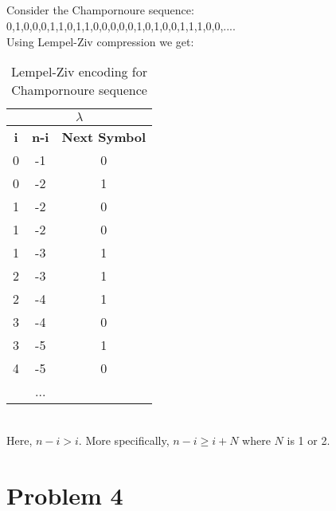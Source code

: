 \documentclass[paper=a4, fontsize=11pt]{scrartcl} %
\numberwithin{equation}{section} %
\numberwithin{figure}{section} %
\numberwithin{table}{section} %
\begin{document}
\subsection{}
Consider the Champornoure sequence:\\ 0,1,0,0,0,1,1,0,1,1,0,0,0,0,0,1,0,1,0,0,1,1,1,0,0,....\\
Using Lempel-Ziv compression we get: 
\begin{table}[h]
	\caption{Lempel-Ziv encoding for Champornoure sequence}
	\centering
	\begin{tabular}{|c|c|c|}
		\hline
		\multicolumn{3}{|c|}{$\lambda$}\\
		\hline
		\textbf{i}	& \textbf{n-i} & \textbf{Next Symbol} \\
		\hline
		0	&	-1	&	0\\
		0	& 	-2	&	1\\
		1	&	-2	&	0\\
		1	&	-2	&	0\\
		1	&	-3	&	1\\
		2	&	-3	&	1\\
		2	&	-4	&	1\\
		3	&	-4	&	0\\
		3	&	-5	&	1\\
		4	&	-5	&	0\\
			&	...	&	\\		
			\hline				
	\end{tabular}
\end{table}\\
Here, $n-i > i$. More specifically, 
$n-i \geq i + N$ where $N$ is 1 or 2.
\section{Problem 4}
\end{document}
